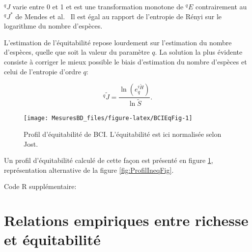 \documentclass[
  11pt,
  french,
  a4paper,
  extrafontsizes,onecolumn,openright
  ]{memoir}
\newenvironment{Shaded}{\begin{snugshade}}{\end{snugshade}}
\newcommand{\DataTypeTok}[1]{\textcolor[rgb]{0.13,0.29,0.53}{#1}}
\newcommand{\KeywordTok}[1]{\textcolor[rgb]{0.13,0.29,0.53}{\textbf{#1}}}
\newcommand{\NormalTok}[1]{#1}
\newcommand{\OperatorTok}[1]{\textcolor[rgb]{0.81,0.36,0.00}{\textbf{#1}}}
\newcommand{\StringTok}[1]{\textcolor[rgb]{0.31,0.60,0.02}{#1}}
\begin{document}
\(^{q}\!J\) varie entre 0 et 1 et est une transformation monotone de \(^{q}\!E\) contrairement au \(^{q}\!J^{*}\) de Mendes et al.~
Il est égal au rapport de l'entropie de Rényi sur le logarithme du nombre d'espèces.

L'estimation de l'équitabilité repose lourdement sur l'estimation du nombre d'espèces, quelle que soit la valeur du paramètre \(q\).
La solution la plus évidente consiste à corriger le mieux possible le biais d'estimation du nombre d'espèces et celui de l'entropie d'ordre \(q\):

\begin{equation}
  \label{eq:EstJq}
  ^q\!{\tilde{J}}= \frac{\ln\left(e_q^{^q{\tilde{H}}} \right)}{\ln\tilde{S}}.
\end{equation}



\scriptsize

\begin{figure}

{\centering \texttt{[image: MesuresBD\_files/figure-latex/BCIEqFig-1]} 

}

\caption{Profil d'équitabilité de BCI. L'équitabilité est ici normalisée selon Jost.}\label{fig:BCIEqFig}
\end{figure}

\normalsize

Un profil d'équitabilité calculé de cette façon est présenté en figure \ref{fig:BCIEqFig}, représentation alternative de la figure \ref{fig:ProfilIneqFig}.

Code R supplémentaire:

\scriptsize

\begin{Shaded}
\end{Shaded}

\normalsize

\hypertarget{relations-empiriques-entre-richesse-et-uxe9quitabilituxe9}{%
\section{Relations empiriques entre richesse et équitabilité}\label{relations-empiriques-entre-richesse-et-uxe9quitabilituxe9}}
\end{document}
